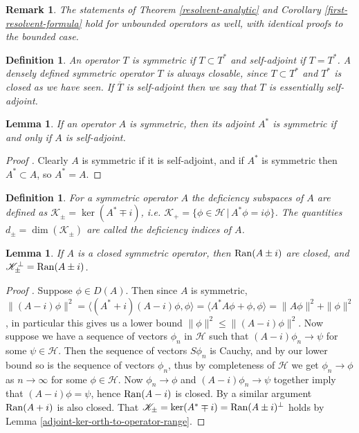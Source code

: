 \documentclass[12pt,oneside]{report}
\newtheorem{lem}[thm]{Lemma}
\newtheorem{defn}[thm]{Definition}
\newtheorem{rem}[thm]{Remark}
\begin{document}
\begin{rem}\label{first-resolvent-remark-unbdd}
    The statements of Theorem \ref{resolvent-analytic} and Corollary \ref{first-resolvent-formula} hold for unbounded operators as well, with identical proofs to the bounded case.
\end{rem}

\begin{defn}
    An operator $T$ is symmetric if $T \subset T^{*}$ and self-adjoint if $T = T^{*}$. A densely defined symmetric operator $T$ is always closable, since $T \subset T^{*}$ and $T^{*}$ is closed as we have seen. If $\overline{T}$ is self-adjoint then we say that $T$ is essentially self-adjoint.
\end{defn}

\begin{lem}
    If an operator $A$ is symmetric, then its adjoint $A^{*}$ is symmetric if and only if $A$ is self-adjoint.
\end{lem}
\begin{proof}[Proof \cite{Reed_Simon_1980}]
    Clearly $A$ is symmetric if it is self-adjoint, and if $A^{*}$ is symmetric then $A^{*} \subset A$, so $A^{*} = A$.
\end{proof}

\begin{defn}
    For a symmetric operator $A$ the deficiency subspaces of $A$ are defined as $\mathscr{K}_{\pm} = \ker(A^{*}\mp i)$, i.e. $\mathscr{K}_{+} = \{ \phi \in \mathscr{H} \, | \, A^{*}\phi = i \phi \}$. The quantities $d_{\pm} = \dim(\mathscr{K}_{\pm})$ are called the deficiency indices of $A$.
\end{defn}

\begin{lem}\label{RanAplusi-closed}
    If $A$ is a closed symmetric operator, then $\mathrm{Ran}(A\pm i)$ are closed, and $\mathscr{K}_{\pm}^{\perp} = \mathrm{Ran}(A\pm i)$.
\end{lem}
\begin{proof}[Proof \cite{murthy_answer_2020}]
    Suppose $\phi \in D(A)$. Then since $A$ is symmetric, $\|(A - i)\phi\|^{2} = \langle (A^{*}+i)(A-i)\phi,\phi \rangle = \langle A^{*}A\phi + \phi, \phi \rangle = \|A\phi\|^{2} + \|\phi\|^{2}$, in particular this gives us a lower bound $\|\phi\|^{2} \leq \|(A-i)\phi\|^{2}$. Now suppose we have a sequence of vectors $\phi_{n}$ in $\mathscr{H}$ such that $(A-i)\phi_{n} \to \psi$ for some $\psi \in \mathscr{H}$. Then the sequence of vectors $S\phi_{n}$ is Cauchy, and by our lower bound so is the sequence of vectors $\phi_{n}$, thus by completeness of $\mathscr{H}$ we get $\phi_{n} \to \phi$ as $n \to \infty$ for some $\phi \in \mathscr{H}$. Now $\phi_{n} \to \phi$ and $(A-i)\phi_{n} \to \psi$ together imply that $(A-i)\phi = \psi$, hence $\mathrm{Ran}(A-i)$ is closed. By a similar argument $\mathrm{Ran}(A+i)$ is also closed. That $\mathscr{K}_{\pm} = \ker(A^{*}\mp i) = \mathrm{Ran}(A \pm i)^{\perp}$ holds by Lemma \ref{adjoint-ker-orth-to-operator-range}.
\end{proof}
\end{document}
